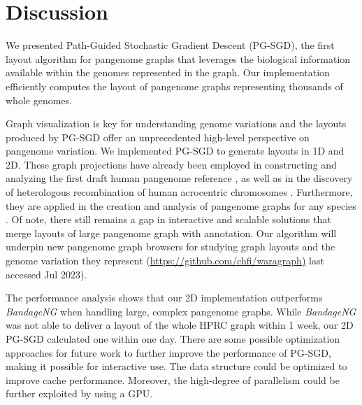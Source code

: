 \documentclass{bioinfo}
\theoremstyle{definition}
\newcommand{\red}[1]{{\textcolor{Red}{#1}}}
\newcommand{\FIXME}[1]{\red{[FIXME: #1]}}
\begin{document}
	\section{Discussion}
	\label{sec:discussion}
	
	We presented Path-Guided Stochastic Gradient Descent (PG-SGD), the first layout algorithm for pangenome graphs that leverages the biological information available within the genomes represented in the graph.
	Our implementation efficiently computes the layout of pangenome graphs representing thousands of whole genomes.
	
	Graph visualization is key for understanding genome variations and the layouts produced by PG-SGD offer an unprecedented high-level perspective on pangenome variation.
	We implemented PG-SGD to generate layouts in 1D and 2D.
	These graph projections have already been employed in constructing and analyzing the first draft human pangenome reference \citep{Liao2023}, as well as in the discovery of heterologous recombination of human acrocentric chromosomes \citep{Guarracino2023}.
	Furthermore, they are applied in the creation and analysis of pangenome graphs for any species \citep{Guarracino2022, Garrison2023}.
	Of note, there still remains a gap in interactive and scalable solutions that merge layouts of large pangenome graph with annotation.
	Our algorithm will underpin new pangenome graph browsers for studying graph layouts and the genome variation they represent (\url{https://github.com/chfi/waragraph)} last accessed Jul 2023).
	
	The performance analysis shows that our 2D implementation outperforms \textit{BandageNG} when handling large, complex pangenome graphs.
	While \textit{BandageNG} was not able to deliver a layout of the whole HPRC graph within 1 week, our 2D PG-SGD calculated one within one day.
	There are some possible optimization approaches for future work to further improve the performance of PG-SGD, making it possible for interactive use. 
	The data structure could be optimized to improve cache performance. Moreover, the high-degree of parallelism could be further exploited by using a GPU.  
\end{document}
